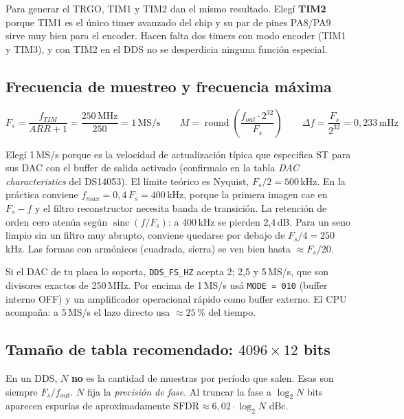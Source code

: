 \documentclass[11pt,a4paper]{article}
\begin{document}
Para generar el TRGO, TIM1 y TIM2 dan el mismo resultado. Elegí \textbf{TIM2}
porque TIM1 es el único timer avanzado del chip y su par de pines PA8/PA9 sirve
muy bien para el encoder. Hacen falta dos timers con modo encoder (TIM1 y TIM3),
y con TIM2 en el DDS no se desperdicia ninguna función especial.

\subsection{Frecuencia de muestreo y frecuencia máxima}

\begin{equation}
F_s = \frac{f_{TIM}}{ARR+1} = \frac{250\,\text{MHz}}{250} = 1\,\text{MS/s}
\qquad
M = \operatorname{round}\!\left(\frac{f_{out}\cdot 2^{32}}{F_s}\right)
\qquad
\Delta f = \frac{F_s}{2^{32}} = 0{,}233\,\text{mHz}
\end{equation}

Elegí 1\,MS/s porque es la velocidad de actualización típica que especifica ST
para sus DAC con el buffer de salida activado (confirmalo en la tabla
\emph{DAC characteristics} del DS14053). El límite teórico es Nyquist,
$F_s/2 = 500$\,kHz. En la práctica conviene $f_{max} = 0{,}4\,F_s = 400$\,kHz,
porque la primera imagen cae en $F_s - f$ y el filtro reconstructor necesita
banda de transición. La retención de orden cero atenúa según
$\operatorname{sinc}(f/F_s)$: a 400\,kHz se pierden 2,4\,dB. Para un seno limpio
sin un filtro muy abrupto, conviene quedarse por debajo de $F_s/4 = 250$\,kHz.
Las formas con armónicos (cuadrada, sierra) se ven bien hasta $\approx F_s/20$.

Si el DAC de tu placa lo soporta, \texttt{DDS\_FS\_HZ} acepta 2; 2,5 y 5\,MS/s,
que son divisores exactos de 250\,MHz. Por encima de 1\,MS/s usá
\texttt{MODE = 010} (buffer interno OFF) y un amplificador operacional rápido
como buffer externo. El CPU acompaña: a 5\,MS/s el lazo directo usa
$\approx 25$\,\% del tiempo.

\subsection{Tamaño de tabla recomendado: \texorpdfstring{$4096\times12$}{4096x12} bits}

En un DDS, $N$ \textbf{no} es la cantidad de muestras por período que salen. Esas
son siempre $F_s/f_{out}$. $N$ fija la \emph{precisión de fase}. Al truncar la
fase a $\log_2 N$ bits aparecen espurias de aproximadamente
$\text{SFDR}\approx 6{,}02\cdot\log_2 N$ dBc.
\end{document}
